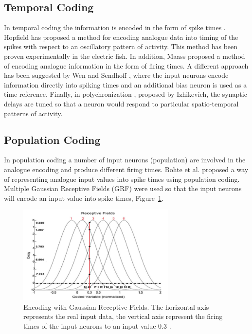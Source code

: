 \subsection{Temporal Coding}

In temporal coding the information is encoded in the form of spike times \cite{Bohte:2004:ENI:990372.990380}. Hopfield \cite{hopfield_pattern_1995} has proposed a method for encoding analogue data into timing of the spikes with respect to an oscillatory pattern of activity. This method has been proven experimentally in the electric fish. In addition, Maass \cite{Maass97networksof} proposed a method of encoding analogue information in the form of firing times. A different approach has been suggested by Wen and Sendhoff \cite{Jin:2007:EMO:1776814.1776856}, where the input neurons encode information directly into spiking times and an additional bias neuron is used as a time reference. Finally, in polychronization \cite{Izhikevich:2006:PCS:1117652.1117653}, proposed by Izhikevich,  the synaptic delays are tuned so that a neuron would respond to particular spatio-temporal patterns of activity.

\subsection{Population Coding}

In population coding a number of input neurons (population) are involved in the analogue encoding and produce different firing times. Bohte et al. \cite{Bohte02unsupervisedclustering} proposed a way of representing analogue input values into spike times using population coding. Multiple Gaussian Receptive Fields (GRF) were used so that the input neurons will encode an input value into spike times, Figure~\ref{codpop1}.  

\begin{figure}[h!]
\centering
\centering
\includegraphics[width=0.7\textwidth]{chapter2/codpop.png}
	\caption{ Encoding with Gaussian Receptive Fields. The horizontal axis represents the real input data, the vertical axis represent the firing times of the input neurons to an input value 0.3 \cite{Meftah:2010:SED:1873252.1873282}. }
	\label{codpop1}
\end{figure}

